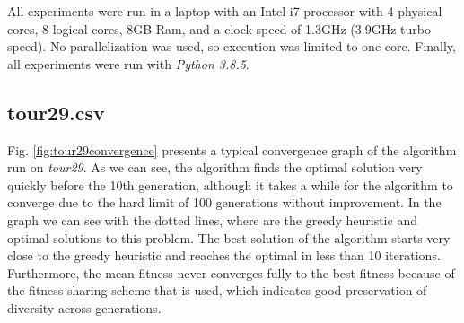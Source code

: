 \documentclass[a4paper,10pt]{article}
\newcommand{\ReplaceMe}[1]{{\color{blue}#1}}
\begin{document}
All experiments were run in a laptop with an Intel i7 processor with 4 physical cores, 8 logical cores, 8GB Ram, and a clock speed of 1.3GHz (3.9GHz turbo speed). No parallelization was used, so execution was limited to one core. Finally, all experiments were run with \textit{Python 3.8.5}.

\subsection{tour29.csv} \label{ss:tour29}





Fig. \ref{fig:tour29convergence} presents a typical convergence graph of the algorithm run on \textit{tour29}. As we can see, the algorithm finds the optimal solution very quickly before the 10th generation, although it takes a while for the algorithm to converge due to the hard limit of 100 generations without improvement. In the graph we can see with the dotted lines, where are the greedy heuristic and optimal solutions to this problem. The best solution of the algorithm starts very close to the greedy heuristic and reaches the optimal in less than 10 iterations. Furthermore, the mean fitness never converges fully to the best fitness because of the fitness sharing scheme that is used, which indicates good preservation of diversity across generations.
\end{document}
